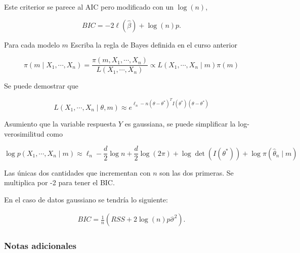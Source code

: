 \documentclass[
  12pt,
]{book}
\begin{document}
Este criterior se parece al AIC pero modificado con un \(\log(n)\),

\[
BIC = -2\ell(\hat{\beta}) + \log(n)p. 
\]

Para cada modelo \(m\) Escriba la regla de Bayes definida en el curso
anterior

\begin{equation*}
\pi\left(m \mid X_{1}, \cdots, X_{n}\right)=\frac{\pi\left(m, X_{1}, \cdots, X_{n}\right)}{L\left(X_{1}, \cdots, X_{n}\right)} \propto L\left(X_{1}, \cdots, X_{n} \mid m\right) \pi(m)
\end{equation*}

Se puede demostrar que

\begin{equation*}
L\left(X_{1}, \cdots, X_{n} \mid \theta, m\right) \approx e^{\ell_{n}-n\left(\theta-\theta^{*}\right)^{T} I\left(\theta^{*}\right)\left(\theta-\theta^{*}\right)}
\end{equation*}

Asumiento que la variable respuesta \(Y\) es gaussiana, se puede
simplificar la log-verosimilitud como

\begin{equation*}
\log p\left(X_{1}, \cdots, X_{n} \mid m\right) \approx \ell_{n}-\frac{d}{2} \log n+\frac{d}{2} \log (2 \pi)+\log \operatorname{det}\left(I\left(\theta^{*}\right)\right)+\log \pi\left(\hat{\theta}_{n} \mid m\right)
\end{equation*}

Las únicas dos cantidades que incrementan con \(n\) son las dos
primeras. Se multiplica por -2 para tener el BIC.

En el caso de datos gaussiano se tendría lo siguiente:

\begin{align*}
BIC = \frac{1}{n}(RSS+2\log (n)p\hat \sigma^2).
\end{align*}

\hypertarget{notas-adicionales}{%
\subsubsection{Notas adicionales}\label{notas-adicionales}}
\end{document}
